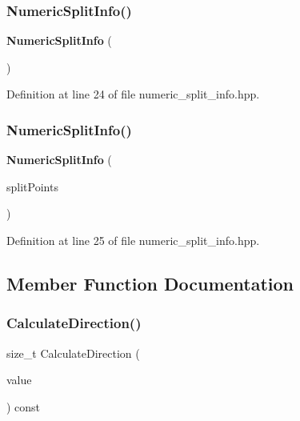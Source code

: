 \subsubsection{Numeric\+Split\+Info()\hspace{0.1cm}{\footnotesize\ttfamily [1/2]}}
{\footnotesize\ttfamily \textbf{ Numeric\+Split\+Info} (\begin{DoxyParamCaption}{ }\end{DoxyParamCaption})\hspace{0.3cm}{\ttfamily [inline]}}



Definition at line 24 of file numeric\+\_\+split\+\_\+info.\+hpp.

\mbox{\label{classmlpack_1_1tree_1_1NumericSplitInfo_af296632ae595098a0a5eaa6d96385e1c}} 
\subsubsection{Numeric\+Split\+Info()\hspace{0.1cm}{\footnotesize\ttfamily [2/2]}}
{\footnotesize\ttfamily \textbf{ Numeric\+Split\+Info} (\begin{DoxyParamCaption}\item[{const arma\+::\+Col$<$ Observation\+Type $>$ \&}]{split\+Points }\end{DoxyParamCaption})\hspace{0.3cm}{\ttfamily [inline]}}



Definition at line 25 of file numeric\+\_\+split\+\_\+info.\+hpp.



\subsection{Member Function Documentation}
\mbox{\label{classmlpack_1_1tree_1_1NumericSplitInfo_aa802a4b4fde3489025146c60ec5b60d3}} 
\subsubsection{Calculate\+Direction()}
{\footnotesize\ttfamily size\+\_\+t Calculate\+Direction (\begin{DoxyParamCaption}\item[{const eT \&}]{value }\end{DoxyParamCaption}) const\hspace{0.3cm}{\ttfamily [inline]}}




